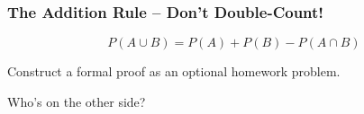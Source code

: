 \documentclass[handout]{beamer}
\begin{document}
\begin{frame}
\frametitle{The Addition Rule -- Don't Double-Count!}
$$P(A\cup B) = P(A) + P(B) - P(A\cap B)$$
\begin{figure}
\centering
{}
\end{figure}
\alert{Construct a formal proof as an optional homework problem.}
\end{frame}
\begin{frame}
\begin{center}\Huge Who's on the other side?\end{center}
\end{frame}
\end{document}
